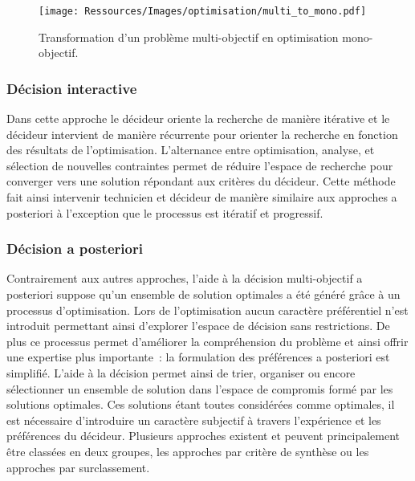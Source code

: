 \begin{figure}
    \begin{center}
        \texttt{[image: Ressources/Images/optimisation/multi\_to\_mono.pdf]}
    \end{center}
    \caption{Transformation d’un problème multi-objectif en optimisation mono-objectif.
             \label{fig:multi_to_mono}}
\end{figure}


\subsubsection{Décision interactive} %
\label{ssub:decision_interactive}
Dans cette approche le décideur oriente la recherche de manière itérative et le
décideur intervient de manière récurrente pour orienter la recherche en fonction
des résultats de l’optimisation. L’alternance entre optimisation, analyse, et
sélection de nouvelles contraintes permet de réduire l’espace de recherche pour
converger vers une solution répondant aux critères du décideur. Cette méthode
fait ainsi intervenir technicien et décideur de manière similaire aux approches
a posteriori à l’exception que le processus est itératif et progressif.


\subsubsection{Décision a posteriori} %
\label{ssub:decision_a_posteriori}
Contrairement aux autres approches, l’aide à la décision multi-objectif a posteriori
suppose qu’un ensemble de solution optimales a été généré grâce à un processus
d’optimisation. Lors de l’optimisation aucun caractère préférentiel
n’est introduit permettant ainsi d’explorer l’espace de décision sans restrictions.
De plus ce processus permet d’améliorer la compréhension du problème et ainsi
offrir une expertise plus importante~: la formulation des préférences a posteriori
est simplifié.
L’aide à la décision permet ainsi de trier, organiser ou encore sélectionner un
ensemble de solution dans l’espace de compromis formé par les solutions optimales.
Ces solutions étant toutes considérées comme optimales, il est nécessaire d’introduire
un caractère subjectif à travers l’expérience et les préférences du décideur.
Plusieurs approches existent et peuvent principalement être classées en deux groupes,
les approches par critère de synthèse ou les approches par surclassement.



